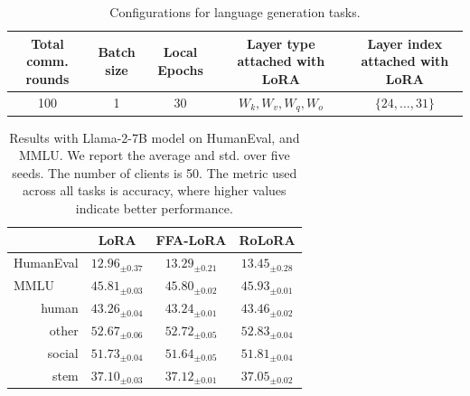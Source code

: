 \documentclass{article}
\theoremstyle{plain}
\theoremstyle{definition}
\theoremstyle{remark}
\begin{document}
\begin{table}[h!]
    \centering
    {\scriptsize
    \begin{tabular}{ccccc}
    \toprule
        Total comm. rounds & Batch size &  Local Epochs & Layer type attached with LoRA &Layer index attached with LoRA \\
        \midrule
        100 & 1 & 30 & $W_k,W_v, W_q, W_o$ & $\{24,\ldots,31\}$\\
        \bottomrule
    \end{tabular}
    \vspace{4pt}
    \caption{Configurations for language generation tasks.}
    \label{tab:my_label}}
\end{table}
\begin{table}[h!]
\centering
{\footnotesize
\begin{tabular}{lccc}
\toprule
                           & LoRA & FFA-LoRA & \cellcolor{ours} RoLoRA \\ \midrule
HumanEval                  &   $\text{12.96}_{\pm \text{0.37}}$    &     $\text{13.29}_{\pm \text{0.21}}$     &   
\cellcolor{ours}$\text{13.45}_{\pm \text{0.28}}$ \\ \midrule
MMLU                       &   $\text{45.81}_{\pm \text{0.03}}$   &   $\text{45.80}_{\pm \text{0.02}}$        &   \cellcolor{ours}  $\text{45.93}_{\pm \text{0.01}}$     \\
\multicolumn{1}{r}{human}  &  $\text{43.26}_{\pm \text{0.04}}$    &         $\text{43.24}_{\pm \text{0.01}}$   & \cellcolor{ours} \cellcolor{ours} $\text{43.46}_{\pm \text{0.02}}$     \\
\multicolumn{1}{r}{other}  &  $\text{52.67}_{\pm \text{0.06}}$    &   $\text{52.72}_{\pm \text{0.05}}$       &   \cellcolor{ours}    $\text{52.83}_{\pm \text{0.04}}$   \\
\multicolumn{1}{r}{social} &    $\text{51.73}_{\pm \text{0.04}}$    &           $\text{51.64}_{\pm \text{0.05}}$ &    \cellcolor{ours}    $\text{51.81}_{\pm \text{0.04}}$ \\
\multicolumn{1}{r}{stem}   &   $\text{37.10}_{\pm \text{0.03}}$   &  $\text{37.12}_{\pm \text{0.01}}$        &    \cellcolor{ours}  $\text{37.05}_{\pm \text{0.02}}$   \\  
\bottomrule
\end{tabular}}
\vspace{4pt} 
\caption{Results with Llama-2-7B model on HumanEval, and MMLU. We report the average and std. over five seeds. The number of clients is 50. The metric used across all tasks is accuracy, where higher values indicate better performance.}
\label{llama-results}
\end{table}
\end{document}

